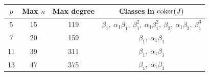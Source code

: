 
  \begin{table}
    \begin{center}
      \renewcommand{\arraystretch}{1.1}
      \begin{tabular}{|c|c|c|c|}\hline
        $p$ & Max $n$ & Max degree & Classes in $\operatorname{\mathrm{coker}}(J)$ \\\hline\hline
        5 & 15 & 119 & $ \beta_1,\ \alpha_1\beta_1,\ \beta_1^2,\ \alpha_1\beta_1^2,\ \beta_2,\ \alpha_1\beta_2,\ \beta_1^3 $\hfill\vadjust{} \\\hline
        7 & 20 & 159 & $\beta_1,\ \alpha_1\beta_1$\hfill\vadjust{} \\\hline
        11 & 39 & 311 & $\beta_1,\ \alpha_1\beta_1$\hfill\vadjust{} \\\hline
        13 & 47 & 375 & $\beta_1,\ \alpha_1\beta_1$\hfill\vadjust{} \\\hline             
      \end{tabular}
      \renewcommand{\arraystretch}{1.0}
      \vspace{0.5cm}
      \caption{}
      \label{tbl:small-stems}
    \end{center}
  \end{table}
  







